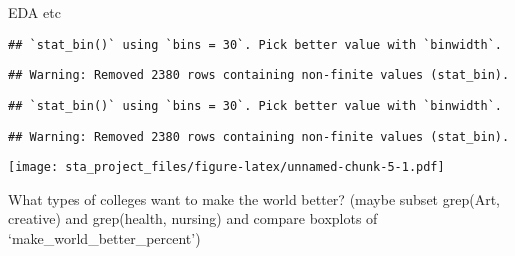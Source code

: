 \documentclass[
]{article}
\newenvironment{Shaded}{\begin{snugshade}}{\end{snugshade}}
\newcommand{\CommentTok}[1]{\textcolor[rgb]{0.56,0.35,0.01}{\textit{#1}}}
\newcommand{\DataTypeTok}[1]{\textcolor[rgb]{0.13,0.29,0.53}{#1}}
\newcommand{\FloatTok}[1]{\textcolor[rgb]{0.00,0.00,0.81}{#1}}
\newcommand{\KeywordTok}[1]{\textcolor[rgb]{0.13,0.29,0.53}{\textbf{#1}}}
\newcommand{\NormalTok}[1]{#1}
\newcommand{\OperatorTok}[1]{\textcolor[rgb]{0.81,0.36,0.00}{\textbf{#1}}}
\newcommand{\StringTok}[1]{\textcolor[rgb]{0.31,0.60,0.02}{#1}}
\begin{document}
EDA etc

\begin{Shaded}
\end{Shaded}

\begin{verbatim}
## `stat_bin()` using `bins = 30`. Pick better value with `binwidth`.
\end{verbatim}

\begin{verbatim}
## Warning: Removed 2380 rows containing non-finite values (stat_bin).
\end{verbatim}

\begin{verbatim}
## `stat_bin()` using `bins = 30`. Pick better value with `binwidth`.
\end{verbatim}

\begin{verbatim}
## Warning: Removed 2380 rows containing non-finite values (stat_bin).
\end{verbatim}

\texttt{[image: sta\_project\_files/figure-latex/unnamed-chunk-5-1.pdf]}

What types of colleges want to make the world better? (maybe subset
grep(Art, creative) and grep(health, nursing) and compare boxplots of
`make\_world\_better\_percent')

\begin{Shaded}
\end{Shaded}
\end{document}

